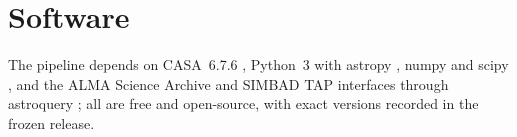 \section*{Software}
The pipeline depends on CASA~6.7.6 \citep[casatools/casatasks
6.7.6-14;][]{CASA2022}, Python~3 with astropy \citep{Astropy2022}, numpy
\citep{Harris2020} and scipy \citep{Virtanen2020}, and the ALMA Science
Archive and SIMBAD TAP interfaces through astroquery \citep{Ginsburg2019};
all are free and open-source, with exact
versions recorded in the frozen release.
